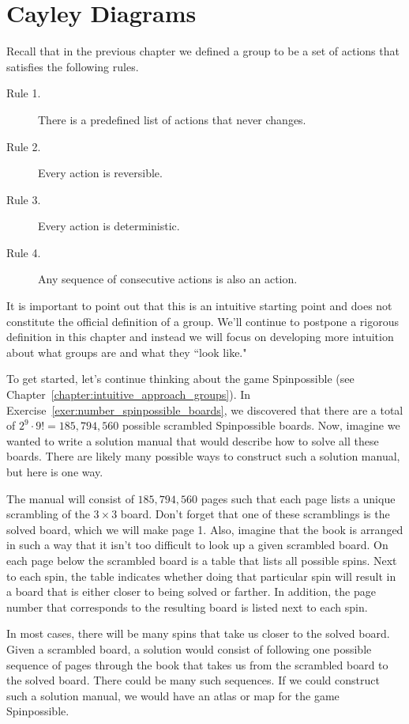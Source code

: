 \chapter{Cayley Diagrams}
\label{chapter:cayley_diagrams}
\thispagestyle{empty}

Recall that in the previous chapter we defined a group to be a set of actions that satisfies the following rules.

\begin{description}
\item[Rule 1.] There is a predefined list of actions that never changes.
\item[Rule 2.] Every action is reversible.
\item[Rule 3.] Every action is deterministic.
\item[Rule 4.] Any sequence of consecutive actions is also an action.
\end{description}

It is important to point out that this is an intuitive starting point and does not constitute the official definition of a group.  We'll continue to postpone a rigorous definition in this chapter and instead we will focus on developing more intuition about what groups are and what they ``look like."  

To get started, let's continue thinking about the game Spinpossible (see Chapter~\ref{chapter:intuitive_approach_groups}).  In Exercise~\ref{exer:number_spinpossible_boards}, we discovered that there are a total of $2^9\cdot 9! = 185,794,560$ possible scrambled Spinpossible boards.  Now, imagine we wanted to write a solution manual that would describe how to solve all these boards.  There are likely many possible ways to construct such a solution manual, but here is one way.  

The manual will consist of $185,794,560$ pages such that each page lists a unique scrambling of the $3\times 3$ board.  Don't forget that one of these scramblings is the solved board, which we will make page 1.  Also, imagine that the book is arranged in such a way that it isn't too difficult to look up a given scrambled board.  On each page below the scrambled board is a table that lists all possible spins.  Next to each spin, the table indicates whether doing that particular spin will result in a board that is either closer to being solved or farther.  In addition, the page number that corresponds to the resulting board is listed next to each spin.

In most cases, there will be many spins that take us closer to the solved board.  Given a scrambled board, a solution would consist of following one possible sequence of pages through the book that takes us from the scrambled board to the solved board.  There could be many such sequences.  If we could construct such a solution manual, we would have an atlas or map for the game Spinpossible.


